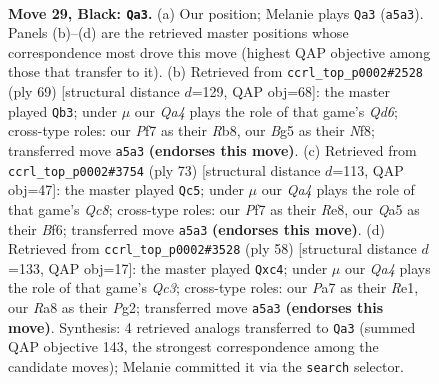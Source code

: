 \documentclass[11pt]{article}
\begin{document}
\clearpage

\begin{figure}[p]\centering
\begin{subfigure}{0.46\textwidth}\centering
\resizebox{\linewidth}{!}{%
\newchessgame
\chessboard[
  setfen={rn5k/p2n1p2/3p4/qR1P2b1/4P1P1/2NQ4/4N3/4K3 b - - 1 29},
  showmover=false,
  pgfstyle=straightmove, color=movearrow, markmove={a5-a3}
]}
\caption{}
\end{subfigure}\hfill
\begin{subfigure}{0.46\textwidth}\centering
\resizebox{\linewidth}{!}{%
\newchessgame
\chessboard[
  setfen={1r3nk1/7p/3p1b2/8/3Pp1p1/3qB1P1/4NP2/3R1QK1 b - - 1 35},
  showmover=false,
  pgfstyle=straightmove, color=movearrow, markmove={d3-b3}
]}
\caption{}
\end{subfigure}
\\[4pt]
\begin{subfigure}{0.46\textwidth}\centering
\resizebox{\linewidth}{!}{%
\newchessgame
\chessboard[
  setfen={4r1k1/8/2p2bp1/4p1Nn/4P2Q/1P5P/3B1RPK/2q5 b - - 6 37},
  showmover=false,
  pgfstyle=straightmove, color=movearrow, markmove={c1-c5}
]}
\caption{}
\end{subfigure}\hfill
\begin{subfigure}{0.46\textwidth}\centering
\resizebox{\linewidth}{!}{%
\newchessgame
\chessboard[
  setfen={6k1/pp3r1p/2nq1npB/8/2p5/2Q4P/P5P1/K2BR3 w - - 1 30},
  showmover=false,
  pgfstyle=straightmove, color=movearrow, markmove={c3-c4}
]}
\caption{}
\end{subfigure}
\caption{\textbf{Move 29, Black: \texttt{Qa3}.} (a) Our position; Melanie plays \texttt{Qa3} (\texttt{a5a3}). Panels (b)--(d) are the retrieved master positions whose correspondence most drove this move (highest QAP objective among those that transfer to it). (b) Retrieved from \texttt{ccrl\_top\_p0002\#2528} (ply 69) [structural distance $d$=129, QAP obj=68]: the master played \texttt{Qb3}; under $\mu$ our \emph{Qa4} plays the role of that game's \emph{Qd6}; cross-type roles: our \emph{P}f7 as their \emph{R}b8, our \emph{B}g5 as their \emph{N}f8; transferred move \texttt{a5a3} \textbf{(endorses this move)}. (c) Retrieved from \texttt{ccrl\_top\_p0002\#3754} (ply 73) [structural distance $d$=113, QAP obj=47]: the master played \texttt{Qc5}; under $\mu$ our \emph{Qa4} plays the role of that game's \emph{Qc8}; cross-type roles: our \emph{P}f7 as their \emph{R}e8, our \emph{Q}a5 as their \emph{B}f6; transferred move \texttt{a5a3} \textbf{(endorses this move)}. (d) Retrieved from \texttt{ccrl\_top\_p0002\#3528} (ply 58) [structural distance $d$=133, QAP obj=17]: the master played \texttt{Qxc4}; under $\mu$ our \emph{Qa4} plays the role of that game's \emph{Qc3}; cross-type roles: our \emph{P}a7 as their \emph{R}e1, our \emph{R}a8 as their \emph{P}g2; transferred move \texttt{a5a3} \textbf{(endorses this move)}. Synthesis: 4 retrieved analogs transferred to \texttt{Qa3} (summed QAP objective 143, the strongest correspondence among the candidate moves); Melanie committed it via the \texttt{search} selector.}
\label{fig:thought-m57}
\end{figure}
\end{document}
